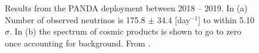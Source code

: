 \begin{figure}[!h]
\begin{subfigure}{.4\textwidth}
  \captionsetup{width=.9\linewidth}
  \caption{}
  \label{subFig:Panda_SpectrumOfCosmicProducts}
\end{subfigure}
\caption{Results from the PANDA deployment between 2018 -- 2019. In (a) Number of observed neutrinos is 175.8 $\pm$ 34.4 [day$^{-1}$] to within 5.10 $\sigma$. In (b) the spectrum of cosmic products is shown to go to zero once accounting for background. From \cite{IIRIE_Panda_2021}.}
\label{fig:Panda_spectrumOfIbdAndCosmicCandidates}
\end{figure}




